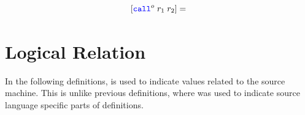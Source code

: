 \documentclass[a4paper]{article}
\begin{document}
\[
  \comp{\scall{o}{r_1}{r_2}} = 
  \begin{array}[t]{l}
  \end{array}
\]

\clearpage

\section{Logical Relation}
In the following definitions,  is used to indicate values related to the source machine. This is unlike previous definitions, where  was used to indicate source language specific parts of definitions.
\end{document}
